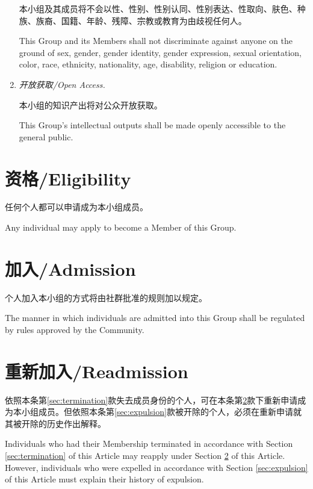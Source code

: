 \documentclass[12pt]{aspasia-constitution}
\begin{document}
\begin{enumerate}[leftmargin=1.25cm]
	本小组及其成员将不会以性、性别、性别认同、性别表达、性取向、肤色、种族、族裔、国籍、年龄、残障、宗教或教育为由歧视任何人。\par
	This Group and its Members shall not discriminate against anyone on the ground of sex, gender, gender identity, gender expression, sexual orientation, color, race, ethnicity, nationality, age, disability, religion or education.
	\item \textit{开放获取/Open Access.}\par\vspace{3pt}
	本小组的知识产出将对公众开放获取。\par
	This Group's intellectual outputs shall be made openly accessible to the general public.
	\end{enumerate}

	 \label{art:membership}
	
	\section{资格/Eligibility} \label{sec:eligibility}
	
	任何个人都可以申请成为本小组成员。
	
	Any individual may apply to become a Member of this Group.
	
	\section{加入/Admission} \label{sec:admission}
	
	个人加入本小组的方式将由社群批准的规则加以规定。
	
	The manner in which individuals are admitted into this Group shall be regulated by rules approved by the Community.
	
	\section{重新加入/Readmission} \label{sec:readmission}
	
	依照本条第\ref{sec:termination}款失去成员身份的个人，可在本条第\ref{sec:admission}款下重新申请成为本小组成员。但依照本条第\ref{sec:expulsion}款被开除的个人，必须在重新申请就其被开除的历史作出解释。
	
	Individuals who had their Membership terminated in accordance with Section \ref{sec:termination} of this Article may reapply under Section \ref{sec:admission} of this Article. However, individuals who were expelled in accordance with Section \ref{sec:expulsion} of this Article must explain their history of expulsion.
	
\end{document}
